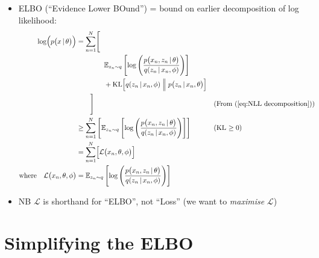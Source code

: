 \documentclass{article}
\begin{document}
\begin{itemize}
    \item ELBO (``Evidence Lower BOund'') = bound on earlier decomposition of log likelihood:
    \begin{align}
        \log\Bigl( p\bigl(x \,\vert\, \theta\bigr) \Bigr) &= \sum_{n=1}^N \Biggl[ \nonumber \\
        &\qquad\qquad \mathbb{E}_{z_n\sim q} \left[ \log\left( \frac{p\bigl(x_n, z_n \,\vert\, \theta\bigr)}{q(z_n \,\vert\, x_n, \phi)} \right) \right] \nonumber \\
        &\qquad\qquad + \text{KL}\Bigl[ q(z_n \,\vert\, x_n, \phi) \Bigm\Vert p\bigl(z_n \,\vert\, x_n, \theta\bigr) \Bigr] \nonumber \\
        &\qquad \Biggr] && \text{(From (\ref{eq:NLL decomposition}))}\\
        &\ge \sum_{n=1}^N \left[ \mathbb{E}_{z_n\sim q} \left[ \log\left( \frac{p\bigl(x_n, z_n \,\vert\, \theta\bigr)}{q(z_n \,\vert\, x_n, \phi)} \right) \right] \right] && \text{(KL $\ge 0$)} \\
        &= \sum_{n=1}^N \Bigl[ \mathcal{L}\bigl( x_n, \theta, \phi \bigr) \Bigr] \\
        \text{where} \quad \mathcal{L}\bigl( x_n, \theta, \phi \bigr) &= \mathbb{E}_{z_n\sim q} \left[ \log\left( \frac{p\bigl(x_n, z_n \,\vert\, \theta\bigr)}{q(z_n \,\vert\, x_n, \phi)} \right) \right] \label{eq:define ELBO}
    \end{align}
    \item NB $\mathcal{L}$ is shorthand for ``ELBO'', not ``Loss'' (we want to \emph{maximise} $\mathcal{L}$)
\end{itemize}

\newpage
\section{Simplifying the ELBO}
\end{document}
